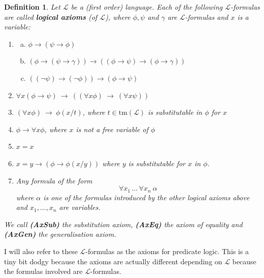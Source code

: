 \documentclass[11pt]{article}
\newcommand{\tm}{\textrm{tm}}
\newtheorem{definition}[theorem]{Definition}
\newcommand{\mcal}[1]{\mathcal{#1}}
\begin{document}
\begin{definition}
Let $\mcal{L}$ be a (first order) language.
Each of the following $\mcal{L}$-formulas are called
\textbf{logical axioms}
 (of $\mcal{L} $), where $\phi ,\psi $ and $\gamma $ are $\mcal{L} $-formulas and $x$ is a variable:

\medskip
\begin{enumerate}
\item[\textbf{(AxProp)}]
\begin{enumerate}[(a)]
\item $\phi \to (\psi \to \phi)$
\item $(\phi \to (\psi \to \gamma)) \to ((\phi \to \psi) \to
(\phi \to \gamma))$
\item $((\lnot\psi)\to (\lnot\phi)) \to ( \phi\to\psi )$
\end{enumerate}
\item[\textbf{(Ax${\forall\!\rightarrow}$)}]
$\forall x(\phi \rightarrow \psi )\ \rightarrow \ ((\forall x \phi) \ \rightarrow \ (\forall x\psi))$
\item[\textbf{(AxSub)}]
$(\forall x\phi )\ \rightarrow \ \phi (x/t)$, where $t\in \tm(\mcal{L})$ is substitutable in $\phi$ for $x$

\item[\textbf{(AxGen)}]
$\phi \rightarrow \forall x\phi $, where $x$ is \textit{not} a free variable of $\phi$

\item[\textbf{(Ax x=x)}] $x=x$
\item[\textbf{(AxEq)} \ ] $x=y\rightarrow (\phi\rightarrow \phi(x/y))$ where $y$ is substitutable for $x$ in $\phi$.
\item[\textbf{(Ax$\forall $)}\ \ \ \ ]
Any formula of the form
$$\forall x_1\,\ldots\,\forall x_n\ \alpha $$
where $\alpha $ is one of the formulas introduced by the other logical axioms
above and $x_1,...,x_n$ are variables.
\end{enumerate}

\noindent
We call \textbf{(AxSub)} the substitution axiom, \textbf{(AxEq)} the axiom of equality and \textbf{(AxGen)} the generalisation axiom.
\end{definition}



I will also refer to these $\mcal{L}$-formulas as the axioms for predicate logic. This is a tiny bit dodgy because the axioms are actually different depending on $\mcal{L}$ because the formulas involved are $\mcal{L}$-formulas.
\end{document}
